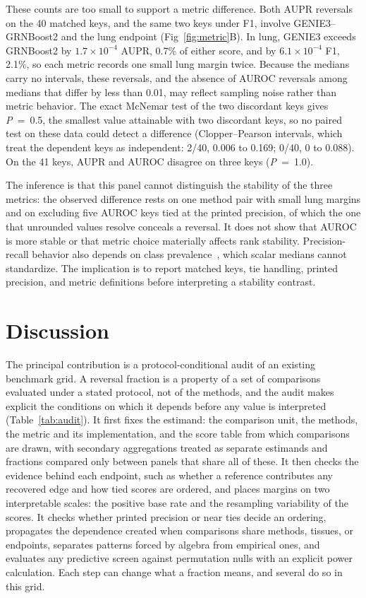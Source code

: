 \documentclass[10pt,letterpaper]{article}
\begin{document}
These counts are too small to support a metric difference. Both AUPR reversals on the 40 matched keys, and the same two keys under F1, involve GENIE3--GRNBoost2 and the lung endpoint (Fig~\ref{fig:metric}B). In lung, GENIE3 exceeds GRNBoost2 by $1.7\times10^{-4}$ AUPR, 0.7\% of either score, and by $6.1\times10^{-4}$ F1, 2.1\%, so each metric records one small lung margin twice. Because the medians carry no intervals, these reversals, and the absence of AUROC reversals among medians that differ by less than 0.01, may reflect sampling noise rather than metric behavior. The exact McNemar test of the two discordant keys gives \textit{P}~=~0.5, the smallest value attainable with two discordant keys, so no paired test on these data could detect a difference (Clopper--Pearson intervals, which treat the dependent keys as independent: 2/40, 0.006 to 0.169; 0/40, 0 to 0.088). On the 41 keys, AUPR and AUROC disagree on three keys (\textit{P}~=~1.0).

The inference is that this panel cannot distinguish the stability of the three metrics: the observed difference rests on one method pair with small lung margins and on excluding five AUROC keys tied at the printed precision, of which the one that unrounded values resolve conceals a reversal. It does not show that AUROC is more stable or that metric choice materially affects rank stability. Precision-recall behavior also depends on class prevalence~\cite{davis2006relationship,saito2015precision}, which scalar medians cannot standardize. The implication is to report matched keys, tie handling, printed precision, and metric definitions before interpreting a stability contrast.

\section*{Discussion}
The principal contribution is a protocol-conditional audit of an existing benchmark grid. A reversal fraction is a property of a set of comparisons evaluated under a stated protocol, not of the methods, and the audit makes explicit the conditions on which it depends before any value is interpreted (Table~\ref{tab:audit}). It first fixes the estimand: the comparison unit, the methods, the metric and its implementation, and the score table from which comparisons are drawn, with secondary aggregations treated as separate estimands and fractions compared only between panels that share all of these. It then checks the evidence behind each endpoint, such as whether a reference contributes any recovered edge and how tied scores are ordered, and places margins on two interpretable scales: the positive base rate and the resampling variability of the scores. It checks whether printed precision or near ties decide an ordering, propagates the dependence created when comparisons share methods, tissues, or endpoints, separates patterns forced by algebra from empirical ones, and evaluates any predictive screen against permutation nulls with an explicit power calculation. Each step can change what a fraction means, and several do so in this grid.
\end{document}
